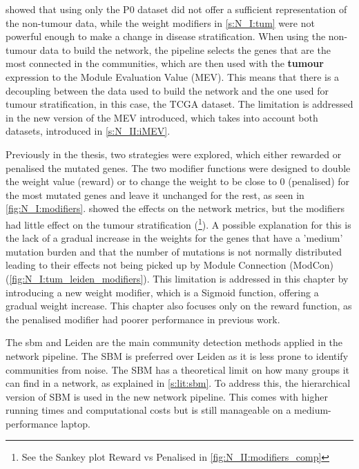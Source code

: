  showed that using only the P0 dataset did not offer a sufficient representation of the non-tumour data, while the weight modifiers in \cref{s:N_I:tum} were not powerful enough to make a change in disease stratification. When using the non-tumour data to build the network, the pipeline selects the genes that are the most connected in the communities, which are then used with the \textbf{tumour} expression to the Module Evaluation Value (MEV). This means that there is a decoupling between the data used to build the network and the one used for tumour stratification, in this case, the TCGA dataset. The limitation is addressed in the new version of the MEV introduced, which takes into account both datasets, introduced in \cref{s:N_II:iMEV}.


Previously in the thesis, two strategies were explored, which either rewarded or penalised the mutated genes. The two modifier functions were designed to double the weight value (reward) or to change the weight to be close to 0 (penalised) for the most mutated genes and leave it unchanged for the rest, as seen in \cref{fig:N_I:modifiers}.  showed the effects on the network metrics, but the modifiers had little effect on the tumour stratification (\footnote{See the Sankey plot Reward vs Penalised in \cref{fig:N_II:modifiers_comp}}). A possible explanation for this is the lack of a gradual increase in the weights for the genes that have a 'medium' mutation burden and that the number of mutations is not normally distributed leading to their effects not being picked up by Module Connection (ModCon) (\cref{fig:N_I:tum_leiden_modifiers}). This limitation is addressed in this chapter by introducing a new weight modifier, which is a Sigmoid function, offering a gradual weight increase. This chapter also focuses only on the reward function, as the penalised modifier had poorer performance in previous work.


The \acrfull{sbm} and Leiden are the main community detection methods applied in the network pipeline. The SBM is preferred over Leiden as it is less prone to identify communities from noise. The SBM has a theoretical limit on how many groups it can find in a network, as explained in \cref{s:lit:sbm}. To address this, the hierarchical version of SBM is used in the new network pipeline. This comes with higher running times and computational costs but is still manageable on a medium-performance laptop.

